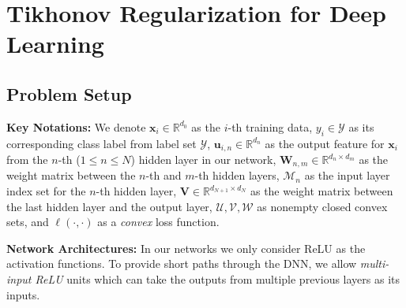\documentclass{article}
\begin{document}
\section{Tikhonov Regularization for Deep Learning}

\subsection{Problem Setup}	
    	 
    {\bf Key Notations:} We denote $\mathbf{x}_i\in\mathbb{R}^{d_0}$ as the $i$-th training data, $y_i\in\mathcal{Y}$ as its corresponding class label from label set $\mathcal{Y}$, $\mathbf{u}_{i,n}\in\mathbb{R}^{d_n}$ as the output feature for $\mathbf{x}_i$ from the $n$-th ($1\leq n\leq N$) hidden layer in our network, $\mathbf{W}_{n,m}\in\mathbb{R}^{d_n\times d_m}$ as the weight matrix between the $n$-th and $m$-th hidden layers, $\mathcal{M}_n$ as the input layer index set for the $n$-th hidden layer, $\mathbf{V}\in\mathbb{R}^{d_{N+1}\times d_N}$ as the weight matrix between the last hidden layer and the output layer, $\mathcal{U}, \mathcal{V}, \mathcal{W}$ as nonempty closed convex sets, and $\ell(\cdot,\cdot)$ as a {\em convex} loss function.      
    	        
	{\bf Network Architectures:} In our networks we only consider ReLU as the activation functions.  To provide short paths through the DNN, we allow {\em multi-input ReLU} units which can take the outputs from multiple previous layers as its inputs. 
    
\end{document}
